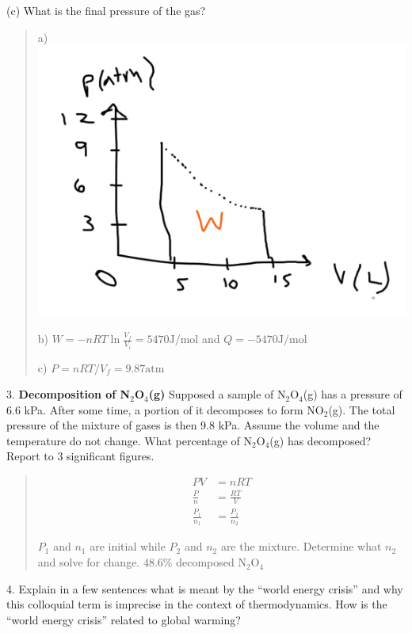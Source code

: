 \documentclass[11pt]{article}
\begin{document}
(c) What is the final pressure of the gas?

\begin{quote}
  {\color{blue}
    a) \includegraphics[scale=0.125]{sketch.png}
    
    b) $W = -nRT\ln \frac{V_f}{V_i} =  5470\text{J/mol}$ and $Q=-5470\text{J/mol}$
    
    c) $P= nRT/V_f = 9.87\text{atm}$
  }
\end{quote}

3. \textbf{Decomposition of N$_2$O$_4$(g)} Supposed a sample of N$_2$O$_4$(g) has
a pressure of 6.6 kPa. After some time, a portion of it decomposes to form NO$_2$(g).
The total pressure of the mixture of gases is then 9.8 kPa. Assume the volume and the
temperature do not change. What percentage of N$_2$O$_4$(g) has decomposed? Report to
3 significant figures.

\begin{quote}
  {\color{blue}
    \begin{align}
      PV & = nRT \\
      \frac{P}{n} & = \frac{RT}{V} \\
      \frac{P_1}{n_1} & = \frac{P_2}{n_2} 
    \end{align}

    $P_1$ and $n_1$ are initial while $P_2$ and $n_2$ are the mixture. Determine what $n_2$
    and solve for change. $48.6\%$ decomposed N$_2$O$_4$
    }
\end{quote}

4. Explain in a few sentences what is meant by the ``world energy crisis'' and why
this colloquial term is imprecise in the context of thermodynamics. How is the
``world energy crisis'' related to global warming?
\end{document}
